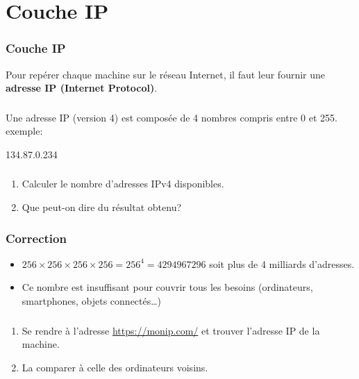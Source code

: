 \documentclass[svgnames,11pt]{beamer}
\begin{document}
\section{Couche IP}
\begin{frame}
    \frametitle{Couche IP}

    \begin{aretenir}[]
    Pour repérer chaque machine sur le réseau Internet, il faut leur fournir une \textbf{adresse IP (Internet Protocol)}.
    \end{aretenir}

\end{frame}
\begin{frame}
    \frametitle{}

    \begin{aretenir}[]
    Une adresse IP (version 4) est composée de 4 nombres compris entre 0 et 255. exemple:
    \begin{center}
        134.87.0.234
    \end{center}
    \end{aretenir}

\end{frame}
\begin{frame}
    \frametitle{}

    \begin{activite}
    \begin{enumerate}
        \item Calculer le nombre d'adresses IPv4 disponibles.
        \item Que peut-on dire du résultat obtenu?
    \end{enumerate}
    \end{activite}

\end{frame}
\begin{frame}
    \frametitle{Correction}

    \begin{itemize}
        \item<1-> $256×256×256×256=256^4=4294967296$ soit plus de 4 milliards d'adresses.
        \item <2-> Ce nombre est insuffisant pour couvrir tous les besoins (ordinateurs, smartphones, objets connectés\dots)
    \end{itemize}

\end{frame}
\begin{frame}
    \frametitle{}

    \begin{activite}
    \begin{enumerate}
        \item Se rendre à l'adresse \url{https://monip.com/} et trouver l'adresse IP de la machine.
        \item La comparer à celle des ordinateurs voisins.
    \end{enumerate}
    \end{activite}

\end{frame}
\end{document}
